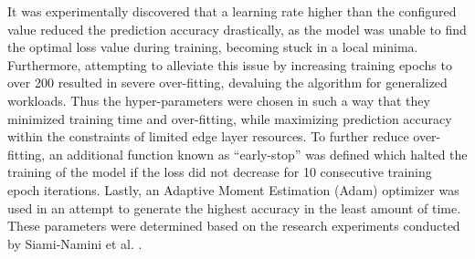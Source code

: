  It was experimentally discovered that a learning rate higher than the configured value reduced the prediction accuracy drastically, as the model was unable to find the optimal loss value during training, becoming stuck in a local minima. Furthermore, attempting to alleviate this issue by increasing training epochs to over 200 resulted in severe over-fitting, devaluing the algorithm for generalized workloads. Thus the hyper-parameters were chosen in such a way that they minimized training time and over-fitting, while maximizing prediction accuracy within the constraints of limited edge layer resources. To further reduce over-fitting, an additional function known as ``early-stop'' was defined which halted the training of the model if the loss did not decrease for 10 consecutive training epoch iterations. Lastly, an Adaptive Moment Estimation (Adam) optimizer \cite{diederik2014adam} was used in an attempt to generate the highest accuracy in the least amount of time. These parameters were determined based on the research experiments conducted by Siami-Namini et al. \cite{siami2018comparison}.\par

\begin{center}
    \label{fig:loss-mse-training}
    \qquad
\end{center}

